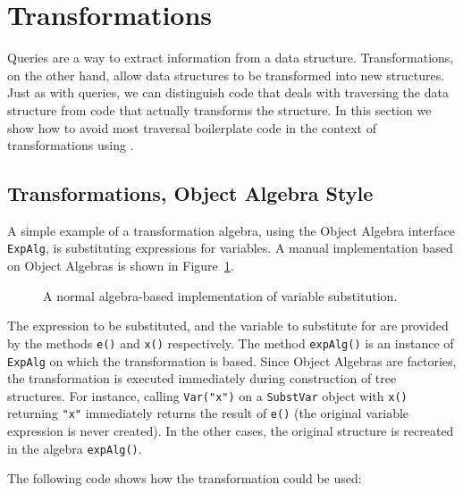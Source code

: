 \section{Transformations}\label{sec:transformations}
\label{retroimp}

Queries are a way to extract information from a data structure.
Transformations, on the other hand, allow data structures to be
transformed into new structures. Just as with queries, we can distinguish code that deals with
traversing the data structure from code that actually transforms the
structure. In this section we show how to avoid most traversal
boilerplate code in the context of transformations using \name.

\subsection{Transformations, Object Algebra Style}\label{subsec:substvars}

A simple example of a transformation algebra, using the Object
Algebra interface \lstinline{ExpAlg}, is substituting expressions for
variables. A manual implementation based on Object Algebras is shown
in Figure~\ref{substvars_without_id}.

\begin{figure}[t]
\nocaptionrule
\caption{A normal algebra-based implementation of variable substitution.}
\label{substvars_without_id}
\end{figure}

The expression to be substituted, and the variable to substitute for
are provided by the methods \lstinline{e()} and \lstinline{x()}
respectively. The method \lstinline{expAlg()} is an instance of
\lstinline{ExpAlg} on which the transformation is based. Since Object
Algebras are factories, the transformation is executed immediately
during construction of tree structures. For instance, calling \lstinline{Var("x")} on a
\lstinline{SubstVar} object with \lstinline{x()} returning
\lstinline{"x"} immediately returns the result of \lstinline{e()}
(the original variable expression is never created). In the other
cases, the original structure is recreated in the algebra
\lstinline{expAlg()}.

The following code shows how the transformation could be used:


